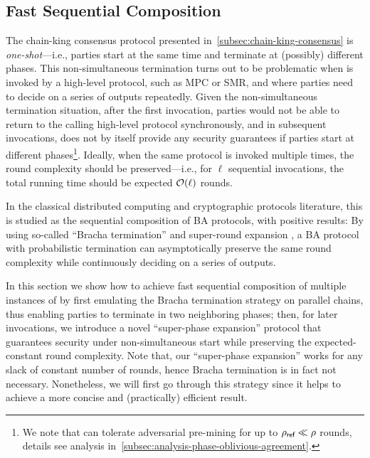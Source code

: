 \subsection{Fast Sequential Composition}
\label{subsec:fast-sequential-composition}

The chain-king consensus protocol presented in~\cref{subsec:chain-king-consensus} is \emph{one-shot}---i.e., parties start at the same time and terminate at (possibly) different phases.
%
This non-simultaneous termination turns out to be problematic when \chainKingConsensus is invoked by a high-level protocol, such as MPC or SMR, and where parties need to decide on a series of outputs repeatedly.
%
Given the non-simultaneous termination situation, after the first invocation, parties would not be able to return to the calling high-level protocol synchronously, and in subsequent invocations, \chainKingConsensus does not by itself provide any security guarantees if parties start at different phases\footnote{We note that \chainKingConsensus can tolerate adversarial pre-mining for up to $\rho_{\textsf{ref}} \ll \rho$ rounds, details see analysis in~\cref{subsec:analysis-phase-oblivious-agreement}.}.
%
Ideally, when the same protocol is invoked multiple times, the round complexity should be preserved---i.e., for $\ell$ sequential invocations, the total running time should be expected $\mathcal{O}(\ell)$ rounds.

In the classical distributed computing and cryptographic protocols literature, this is studied as the sequential composition of BA protocols, with positive results:
%
By using so-called ``Bracha termination'' \cite{PODC:Bracha84} and super-round expansion \cite{C:CCGZ16}, a BA protocol with probabilistic termination can asymptotically preserve the same round complexity while continuously deciding on a series of outputs.

In this section we show how to achieve fast sequential composition of multiple instances of \chainKingConsensus by first emulating the Bracha termination strategy on parallel chains, thus enabling parties to terminate in two neighboring phases; then, for later invocations, we introduce a novel ``super-phase expansion'' protocol that guarantees security under non-simultaneous start while preserving the expected-constant round complexity.
%
Note that, our ``super-phase expansion'' works for any slack of constant number of rounds, hence Bracha termination is in fact not necessary.
%
Nonetheless, we will first go through this strategy since it helps to achieve a more concise and (practically) efficient result.

